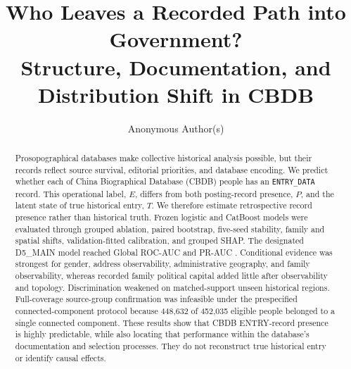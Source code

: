 \documentclass[sigconf]{acmart}
\begin{document}
\title{Who Leaves a Recorded Path into Government?\\Structure, Documentation, and Distribution Shift in CBDB}
\ifanonymous
  \author{Anonymous Author(s)}
\else
  \author{\PaperAuthorName}
\fi

\begin{abstract}
Prosopographical databases make collective historical analysis possible, but their records reflect source survival, editorial priorities, and database encoding. We predict whether each of \NPeople{} China Biographical Database (CBDB) people has an \texttt{ENTRY\_DATA} record. This operational label, $E$, differs from both posting-record presence, $P$, and the latent state of true historical entry, $T$. We therefore estimate retrospective record presence rather than historical truth. Frozen logistic and CatBoost models were evaluated through grouped ablation, paired bootstrap, five-seed stability, family and spatial shifts, validation-fitted calibration, and grouped SHAP. The designated D5\_MAIN model reached Global ROC-AUC \GlobalDfiveRoc{} and PR-AUC \GlobalDfivePr{}. Conditional evidence was strongest for gender, address observability, administrative geography, and family observability, whereas recorded family political capital added little after observability and topology. Discrimination weakened on matched-support unseen historical regions. Full-coverage source-group confirmation was infeasible under the prespecified connected-component protocol because 448,632 of 452,035 eligible people belonged to a single connected component. These results show that CBDB ENTRY-record presence is highly predictable, while also locating that performance within the database's documentation and selection processes. They do not reconstruct true historical entry or identify causal effects.
\end{abstract}


\maketitle
\ifanonymous
\else
\fi
\end{document}
